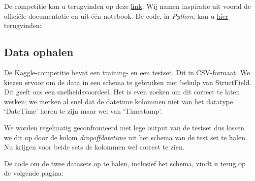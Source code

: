 \documentclass[a4paper,10pt,twoside]{report}
\begin{document}
De competitie kan u terugvinden op deze \href{http://bit.ly/3umBKN5}{link}. Wij namen inspiratie uit vooral de officiële documentatie en uit één notebook. De code, in \textit{Python}, kan u \href{http://bit.ly/3F2Aofj}{hier} terugvinden: 

\newpage

\subsection*{Data ophalen}

De Kaggle-competitie bevat een training- en een testset. Dit in CSV-formaat. We kiezen ervoor om de data in een schema te gebruiken met behulp van StructField. Dit geeft ons een snelheidsvoordeel. Het is even zoeken om dit correct te laten werken; we merken al snel dat de datetime kolommen niet van het datatype ‘DateTime’ horen te zijn maar wel van ‘Timestamp’. 

We worden regelmatig geconfronteerd met lege output van de testset dus lossen we dit op door de kolom \textit{dropoffdatetime} uit het schema van de test set te halen. Nu krijgen voor beide sets de kolommen wel correct te zien.

De code om de twee datasets op te halen, inclusief het schema, vindt u terug op de volgende pagina:
\end{document}
